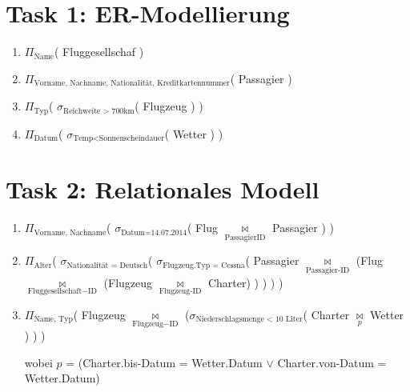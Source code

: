 
\newcommand{\dozent}{Prof. Dr. Agnès Voisard \\ Nicolas Lehmann}					%
\newcommand{\tutor}{Toni Draßdo}						%
\newcommand{\tutoriumNo}{014}				%
\newcommand{\ubungNo}{04}									%
\newcommand{\veranstaltung}{Datenbanksysteme}	%
\newcommand{\semester}{SoSe 18}						%
\newcommand{\studenten}{Eduard Beiline, Mark Niehues, Antoen Oehler}			%

\usepackage[normalem]{ulem}



\newcommand{\proj}[2]{$\Pi_\text{#1}$(\!#2\!)}
\newcommand{\sel}[2]{$\sigma_\text{#1}$(\!#2\!)}
\newcommand{\join}[1]{$\underset{\text{#1}}{\Join}$}

\section*{Task 1: ER-Modellierung}
\begin{enumerate}
	\item \proj{Name}{ Fluggesellschaf }
	\item \proj{Vorname, Nachname, Nationalität, Kreditkartennummer}{ Passagier }
	\item \proj{Typ}{
		\sel{Reichweite > 700km}{ Flugzeug }
	}
	\item \proj{Datum}{
		\sel{Temp<Sonnenscheindauer}{ Wetter }
	}
\end{enumerate}

\section*{Task 2: Relationales Modell}
\begin{enumerate}
	\item \proj{Vorname, Nachname}{
		\sel{Datum=14.07.2014}{
			Flug \join{PassagierID} Passagier
		}
	}
	\item \proj{Alter}{
		\sel{Nationalität = Deutsch}{
			\sel{Flugzeug.Typ = Cessna}{
				Passagier \join{Passagier-ID}
					(Flug \join{Fluggesellschaft−ID}
						(Flugzeug \join{Flugzeug-ID} Charter)
					)
			}
		}
	}
	\item \proj{Name, Typ}
	{
		Flugzeug
		\join{Flugzeug−ID}
		(\sel{Niederschlagsmenge < 10 Liter}
			{ Charter \join{$p$} Wetter }
		)
	}

	wobei $p$ = (Charter.bis-Datum = Wetter.Datum $\vee$
		Charter.von-Datum = Wetter.Datum)
\end{enumerate}

